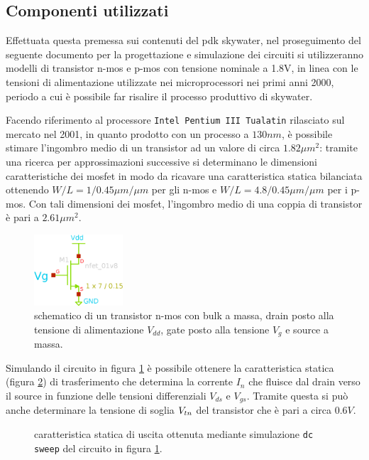 	\subsection*{Componenti utilizzati}
		Effettuata questa premessa sui contenuti del pdk skywater, nel proseguimento del seguente documento per la progettazione e simulazione dei circuiti si utilizzeranno modelli di transistor n-mos e p-mos con tensione nominale a 1.8V, in linea con le tensioni di alimentazione utilizzate nei microprocessori nei primi anni 2000, periodo a cui è possibile far risalire il processo produttivo di skywater. 
		
		Facendo riferimento al processore \texttt{Intel Pentium III Tualatin} \cite{tualatin} rilasciato sul mercato nel 2001, in quanto prodotto con un processo a $130nm$, è possibile stimare l'ingombro medio di un transistor ad un valore di circa $1.82 \mu m^2$: tramite una ricerca per approssimazioni successive si determinano le dimensioni caratteristiche dei mosfet in modo da ricavare una caratteristica statica bilanciata ottenendo $W/L = 1/0.45 \mu m/\mu m$ per gli n-mos e $W/L = 4.8/0.45 \mu m/\mu m$ per i p-mos. Con tali dimensioni dei mosfet, l'ingombro medio di una coppia di transistor è pari a $2.61 \mu m^2$.
		
		\begin{figure}[bht]
			\centering
			\includegraphics[width=3.3cm]{Immagini/nmos.eps}
			\caption{schematico di un transistor n-mos con bulk a massa, drain posto alla tensione di alimentazione $V_{dd}$, gate posto alla tensione $V_g$ e source a massa.} \label{fig:intro:schematico-nmos}
		\end{figure}
	
		Simulando il circuito in figura \ref{fig:intro:schematico-nmos} è possibile ottenere la caratteristica statica (figura \ref{fig:intro:nmos-carattstatica}) di trasferimento che determina la corrente $I_n$ che fluisce dal drain verso il source in funzione delle tensioni differenziali $V_{ds}$ e $V_{gs}$. Tramite questa si può anche determinare la tensione di soglia $V_{tn}$ del transistor che è pari a circa $0.6V$.
		
		\begin{figure}[H]
			\centering
			
			\caption{caratteristica statica di uscita ottenuta mediante simulazione \texttt{dc sweep} del circuito in figura \ref{fig:intro:schematico-nmos}.}
			\label{fig:intro:nmos-carattstatica}
		\end{figure}
		
